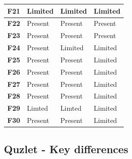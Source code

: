 \documentclass[thesis=B,english]{FITthesis}[2012/10/20]
\begin{document}
\begin{tabular}{|l|l|l|l|}
\textbf{F21}                                                               & Limited                               & Limited                            & Limited                                 \\ \hline
\textbf{F22}                                                               & Present                               & Present                            & Present                                 \\ \hline
\textbf{F23}                                                               & Present                               & Present                            & Present                                 \\ \hline
\textbf{F24}                                                               & Present                               & Limited                            & Limited                                 \\ \hline
\textbf{F25}                                                               & Present                               & Present                            & Limited                                 \\ \hline
\textbf{F26}                                                               & Present                               & Present                            & Limited                                 \\ \hline
\textbf{F27}                                                               & Present                               & Present                            & Limited                                 \\ \hline
\textbf{F28}                                                               & Present                               & Present                            & Limited                                 \\ \hline
\textbf{F29}                                                               & Limted                                & Limted                             & Limited                                 \\ \hline
\textbf{F30}                                                               & Present                               & Present                            & Limited                                 \\ \hline
\end{tabular}

\bigskip
\subsection{Quzlet - Key differences}
\end{document}
